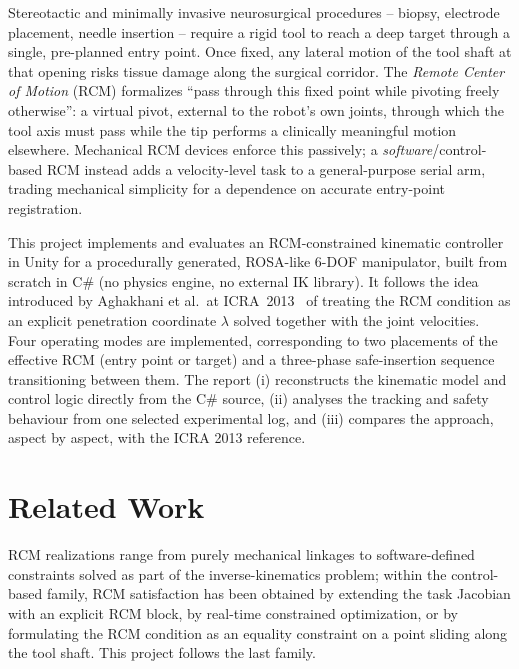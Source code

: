 \documentclass[11pt,a4paper]{article}
\begin{document}
Stereotactic and minimally invasive neurosurgical procedures -- biopsy, electrode placement, needle insertion -- require a rigid tool to reach a deep target through a single, pre-planned entry point. Once fixed, any lateral motion of the tool shaft at that opening risks tissue damage along the surgical corridor. The \emph{Remote Center of Motion} (RCM) formalizes ``pass through this fixed point while pivoting freely otherwise'': a virtual pivot, external to the robot's own joints, through which the tool axis must pass while the tip performs a clinically meaningful motion elsewhere. Mechanical RCM devices enforce this passively; a \emph{software}/control-based RCM instead adds a velocity-level task to a general-purpose serial arm, trading mechanical simplicity for a dependence on accurate entry-point registration.

This project implements and evaluates an RCM-constrained kinematic controller in Unity for a procedurally generated, ROSA-like 6-DOF manipulator, built from scratch in C\# (no physics engine, no external IK library). It follows the idea introduced by Aghakhani et al.\ at ICRA~2013~\cite{aghakhani2013} of treating the RCM condition as an explicit penetration coordinate $\lambda$ solved together with the joint velocities. Four operating modes are implemented, corresponding to two placements of the effective RCM (entry point or target) and a three-phase safe-insertion sequence transitioning between them. The report (i) reconstructs the kinematic model and control logic directly from the C\# source, (ii) analyses the tracking and safety behaviour from one selected experimental log, and (iii) compares the approach, aspect by aspect, with the ICRA 2013 reference.

\section{Related Work}
\label{sec:related}

RCM realizations range from purely mechanical linkages to software-defined constraints solved as part of the inverse-kinematics problem; within the control-based family, RCM satisfaction has been obtained by extending the task Jacobian with an explicit RCM block, by real-time constrained optimization, or by formulating the RCM condition as an equality constraint on a point sliding along the tool shaft. This project follows the last family.
\end{document}

